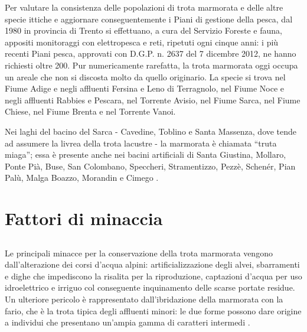 \documentclass[10pt,twoside,openany,x11names,svgnames,italian,a5paper,dvipsnames,table]{memoir}
\newcommand\chapterillustration{}
\begin{document}
Per valutare la consistenza delle popolazioni di trota marmorata e delle altre specie ittiche e aggiornare conseguentemente i Piani di gestione della pesca, dal 1980 in provincia di Trento si effettuano, a cura del Servizio Foreste e fauna, appositi monitoraggi con elettropesca e reti, ripetuti ogni cinque anni: i più recenti Piani pesca, approvati con D.G.P. n. 2637 del 7 dicembre 2012, ne hanno richiesti oltre 200. Pur numericamente rarefatta, la trota marmorata oggi occupa un areale che non si discosta molto da quello originario. La specie si trova nel Fiume Adige e negli affluenti Fersina e Leno di Terragnolo, nel Fiume Noce e negli affluenti Rabbies e Pescara, nel Torrente Avisio, nel Fiume Sarca, nel Fiume Chiese, nel Fiume Brenta e nel Torrente Vanoi. 

Nei laghi del bacino del Sarca - Cavedine, Toblino e Santa Massenza, dove tende ad assumere la livrea della trota lacustre - la marmorata è chiamata “truta miaga”; essa è presente anche nei bacini artificiali di Santa Giustina, Mollaro, Ponte Pià, Buse, San Colombano, Speccheri, Stramentizzo, Pezzè, Schenér, Pian Palù, Malga Boazzo, Morandin e Cimego \cite{Tomasi}.

\begin{comment}
\begin{center}
\texttt{[image: 13\_avisio\_panchia.jpg]}
\captionof*{figure}{L’Avisio presso Panchià (Valle di Fiemme): un tratto di corso d’acqua della Zona della trota marmorata che conserva, in gran parte, l’originaria naturalità.}
\end{center}
\end{comment}

  
\chapter{Fattori di minaccia}
\renewcommand\chapterillustration{3.jpg}
\section*{}
Le principali minacce per la conservazione della trota marmorata vengono dall’alterazione dei corsi d’acqua alpini: artificializzazione degli alvei, sbarramenti e dighe che impediscono la risalita per la riproduzione, captazioni d’acqua per uso idroelettrico e irriguo col conseguente inquinamento delle scarse portate residue. Un ulteriore pericolo è rappresentato dall’ibridazione della marmorata con la fario, che è la trota tipica degli affluenti minori: le due forme possono dare origine a individui che presentano un'ampia gamma di caratteri intermedi \cite{Lucarda}.
\end{document}
